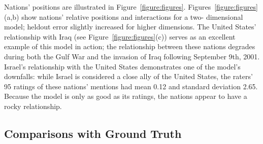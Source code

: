 Nations' positions are illustrated in Figure~\ref{figure:figures}.
Figures~\ref{figure:figures}(a,b) show nations' relative positions
and interactions for a two- dimensional model; heldout error slightly
increased for higher dimensions. The United States' relationship with
Iraq (see Figure~\ref{figure:figures}(c)) serves as an excellent
example of this model in action; the relationship between these
nations degrades during both the Gulf War and the invasion of Iraq
following September 9th, 2001.  Israel's relationship with the United
States demonstrates one of the model's downfalls: while Israel is
considered a close ally of the United States, the raters' 95 ratings
of these nations' mentions had mean 0.12 and standard deviation
2.65.  Because the model is only as good as its ratings, the nations
appear to have a rocky relationship.







\subsection{Comparisons with Ground Truth}
